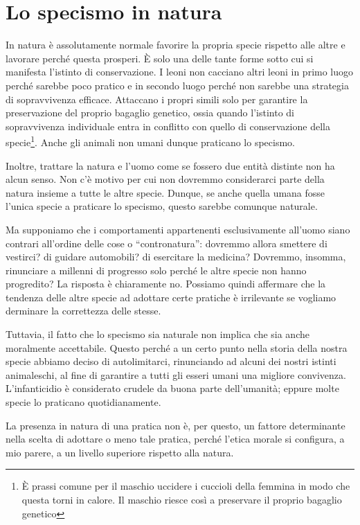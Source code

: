 \chapter{Lo specismo in natura}
\label{ch:lo-specismo-in-natura}

In natura è assolutamente normale favorire la propria specie rispetto alle altre e lavorare perché
questa prosperi. È solo una delle tante forme sotto cui si manifesta l'istinto di conservazione. I
leoni non cacciano altri leoni in primo luogo perché sarebbe poco pratico e in secondo luogo perché
non sarebbe una strategia di sopravvivenza efficace. Attaccano i propri simili solo per garantire la
preservazione del proprio bagaglio genetico, ossia quando l'istinto di sopravvivenza individuale
entra in conflitto con quello di conservazione della specie\footnote{È prassi comune per il maschio
uccidere i cuccioli della femmina in modo che questa torni in calore. Il maschio riesce così a
preservare il proprio bagaglio genetico}. Anche gli animali non umani dunque praticano lo specismo.

Inoltre, trattare la natura e l'uomo come se fossero due entità distinte non ha alcun senso. Non c'è
motivo per cui non dovremmo considerarci parte della natura insieme a tutte le altre specie. Dunque,
se anche quella umana fosse l'unica specie a praticare lo specismo, questo sarebbe comunque
naturale.

Ma supponiamo che i comportamenti appartenenti esclusivamente all'uomo siano contrari all'ordine
delle cose o ``contronatura'': dovremmo allora smettere di vestirci? di guidare automobili? di
esercitare la medicina? Dovremmo, insomma, rinunciare a millenni di progresso solo perché le altre
specie non hanno progredito? La risposta è chiaramente no. Possiamo quindi affermare che la tendenza
delle altre specie ad adottare certe pratiche è irrilevante se vogliamo derminare la correttezza
delle stesse.

Tuttavia, il fatto che lo specismo sia naturale non implica che sia anche moralmente accettabile.
Questo perché a un certo punto nella storia della nostra specie abbiamo deciso di autolimitarci,
rinunciando ad alcuni dei nostri istinti animaleschi, al fine di garantire a tutti gli esseri umani
una migliore convivenza. L'infanticidio è considerato crudele da buona parte dell'umanità; eppure
molte specie lo praticano quotidianamente.

La presenza in natura di una pratica non è, per questo, un fattore determinante nella scelta di
adottare o meno tale pratica, perché l'etica morale si configura, a mio parere, a un livello
superiore rispetto alla natura.
